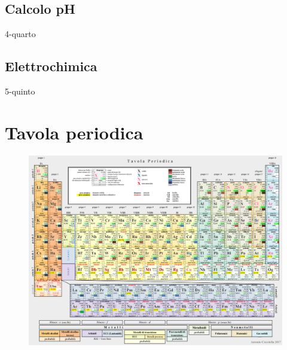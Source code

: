 \documentclass[openany,12pt]{book}%
\begin{document}
\section{Calcolo pH}
{4-quarto}

\section{Elettrochimica}
{5-quinto}

\chapter{Tavola periodica}

\begin{figure}[htp]
  \centering
  \includegraphics[angle=90,origin=c]{immagini/tavola periodica.png}
\end{figure}
\end{document}
